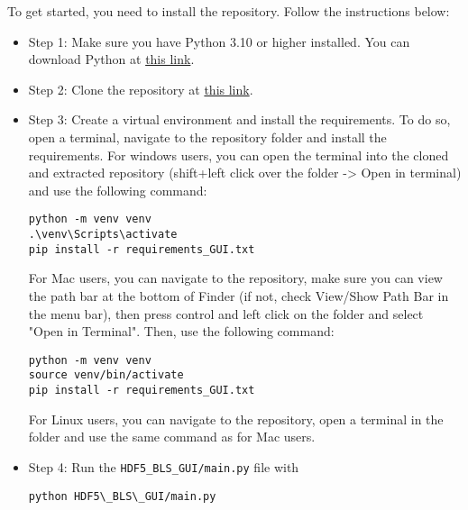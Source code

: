 To get started, you need to install the repository. Follow the instructions below:

\begin{itemize}
    \item Step 1: Make sure you have Python 3.10 or higher installed. You can download Python at \href{https://www.python.org/downloads/}{this link}.
    \item Step 2: Clone the repository at \href{https://github.com/bio-brillouin/HDF5_BLS/tree/main}{this link}.    
    \item Step 3: Create a virtual environment and install the requirements. To do so, open a terminal, navigate to the repository folder and install the requirements. For windows users, you can open the terminal into the cloned and extracted repository (shift+left click over the folder -> Open in terminal) and use the following command:
\begin{lstlisting}
python -m venv venv
.\venv\Scripts\activate
pip install -r requirements_GUI.txt
\end{lstlisting}
    For Mac users, you can navigate to the repository, make sure you can view the path bar at the bottom of Finder (if not, check View/Show Path Bar in the menu bar), then press control and left click on the folder and select "Open in Terminal". Then, use the following command:
\begin{lstlisting}
python -m venv venv
source venv/bin/activate
pip install -r requirements_GUI.txt
\end{lstlisting}
    For Linux users, you can navigate to the repository, open a terminal in the folder and use the same command as for Mac users.
    \item Step 4: Run the \texttt{HDF5\_BLS\_GUI/main.py} file with
\begin{lstlisting}
python HDF5\_BLS\_GUI/main.py
\end{lstlisting}
\end{itemize}